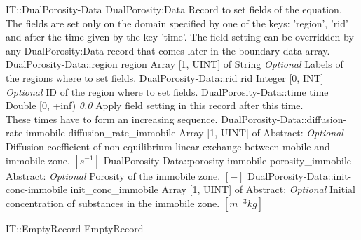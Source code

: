 \begin{RecordType}
	{IT::DualPorosity-Data}
	{DualPorosity:Data}
	{} %
	{} %
	{{{Record to set fields of the equation.}\\{
The fields are set only on the domain specified by one of the keys: 'region', 'rid'}\\{
and after the time given by the key 'time'. The field setting can be overridden by}\\{
 any DualPorosity:Data record that comes later in the boundary data array.}}}
		\RecKey
			{DualPorosity-Data::region}
			{region}
			{{Array [1, UINT] of }{String}}
			{ \it{Optional} }
			{{{Labels of the regions where to set fields. }}}
		\RecKey
			{DualPorosity-Data::rid}
			{rid}
			{{Integer [0, INT]}}
			{ \it{Optional} }
			{{{ID of the region where to set fields.}}}
		\RecKey
			{DualPorosity-Data::time}
			{time}
			{{Double [0, +inf)}}
			{ \it{0.0} }
			{{{Apply field setting in this record after this time.}\\{
These times have to form an increasing sequence.}}}
		\RecKey
			{DualPorosity-Data::diffusion-rate-immobile}
			{diffusion{\_}rate{\_}immobile}
			{{Array [1, UINT] of }{Abstract}{: }}
			{ \it{Optional} }
			{{{Diffusion coefficient of non-equilibrium linear exchange between mobile and immobile zone. }{$[s^{-1}]$}}}
		\RecKey
			{DualPorosity-Data::porosity-immobile}
			{porosity{\_}immobile}
			{{Abstract}{: }}
			{ \it{Optional} }
			{{{Porosity of the immobile zone. }{$[-]$}}}
		\RecKey
			{DualPorosity-Data::init-conc-immobile}
			{init{\_}conc{\_}immobile}
			{{Array [1, UINT] of }{Abstract}{: }}
			{ \it{Optional} }
			{{{Initial concentration of substances in the immobile zone. }{$[m^{-3}kg]$}}}
\end{RecordType}
\begin{RecordType}
	{IT::EmptyRecord}
	{EmptyRecord}
	{} %
	{} %
	{}
\end{RecordType}
